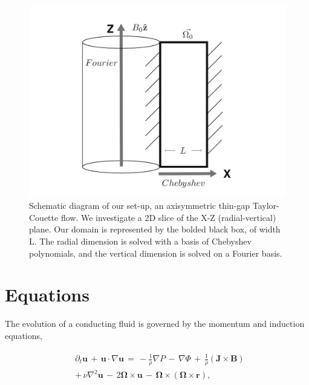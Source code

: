 \documentclass[twocolumn]{aastex61}
\begin{document}
\begin{figure}[h!]
\centering
\includegraphics[trim=5cm 0cm 0cm 0cm, scale=.35]{setup_diagram-eps-converted-to.pdf}
\caption{Schematic diagram of our set-up, an axisymmetric thin-gap Taylor-Couette flow. We investigate a 2D slice of the X-Z (radial-vertical) plane. Our domain is represented by the bolded black box, of width L. The radial dimension is solved with a basis of Chebyshev polynomials, and the vertical dimension is solved on a Fourier basis. }\label{fig:setup}
\end{figure}

\section{Equations}\label{sec:equations}

The evolution of a conducting fluid is governed by the momentum and induction equations,

\begin{eqnarray}\label{eq:momentum}
\begin{split}
& \partial_t \mathbf{u} \, + \, \mathbf{u} \cdot \nabla \mathbf{u} \, = \, -\frac{1}{\rho}\nabla P \, - \, \nabla\Phi \, + \, \frac{1}{\rho} \left(\mathbf{J}\times\mathbf{B}\right) \, \\
& + \, \nu\nabla^2 \mathbf{u} \, - \, 2\mathbf{\Omega} \times \mathbf{u} \, - \, \mathbf{\Omega} \times \left(\mathbf{\Omega} \times \mathbf{r} \right), \\
\end{split}
\end{eqnarray}
\end{document}
